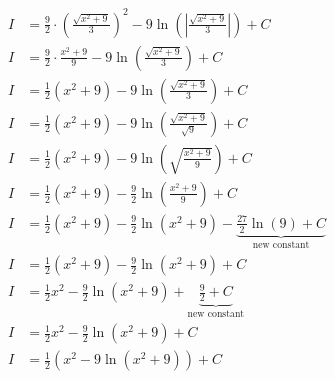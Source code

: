 \documentclass[12pt]{article}
\begin{document}
\begin{align}
    \nonumber                                                                                                                                                                                               \\
    I                                                & = \frac{9}{2}\cdot\left(\frac{\sqrt{x^2+9}}{3}\right)^2 - 9\ln\left(\left|\frac{\sqrt{x^2+9}}{3}\right|\right) + C                                   \\
    I                                                & = \frac{9}{2}\cdot\frac{x^2+9}{9} - 9\ln\left(\frac{\sqrt{x^2+9}}{3}\right) + C                                                                      \\
    I                                                & = \frac{1}{2}(x^2+9) - 9\ln\left(\frac{\sqrt{x^2+9}}{3}\right) + C                                                                                   \\
    I                                                & = \frac{1}{2}(x^2+9) - 9\ln\left(\frac{\sqrt{x^2+9}}{\sqrt{9}}\right) + C                                                                            \\
    I                                                & = \frac{1}{2}(x^2+9) - 9\ln\left(\sqrt{\frac{x^2+9}{9}}\right) + C                                                                                   \\
    I                                                & = \frac{1}{2}(x^2+9) - \frac{9}{2}\ln\left(\frac{x^2+9}{9}\right) + C                                                                                \\
    I                                                & = \frac{1}{2}(x^2+9) - \frac{9}{2}\ln(x^2+9) - \underbrace{\frac{27}{2} \ln(9) + C}_\text{new constant}                                              \\
    I                                                & = \frac{1}{2}(x^2+9) - \frac{9}{2}\ln(x^2+9) + C                                                                                                     \\
    I                                                & = \frac{1}{2}x^2 - \frac{9}{2}\ln(x^2+9) + \underbrace{\frac{9}{2} + C}_\text{new constant}                                                          \\
    I                                                & = \frac{1}{2}x^2 - \frac{9}{2}\ln(x^2+9) + C                                                                                                         \\
    I                                                & = \frac{1}{2}(x^2 - 9\ln(x^2+9)) + C
\end{align}
\end{document}
